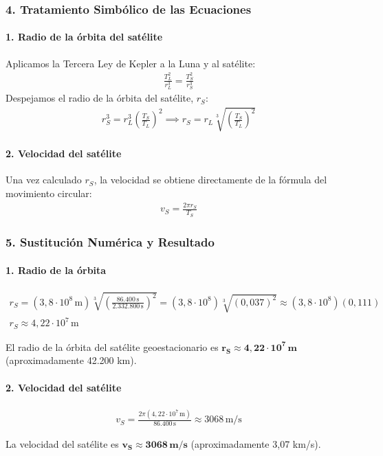 \subsubsection*{4. Tratamiento Simbólico de las Ecuaciones}
\paragraph*{1. Radio de la órbita del satélite}
Aplicamos la Tercera Ley de Kepler a la Luna y al satélite:
\begin{gather}
    \frac{T_L^2}{r_L^3} = \frac{T_S^2}{r_S^3}
\end{gather}
Despejamos el radio de la órbita del satélite, $r_S$:
\begin{gather}
    r_S^3 = r_L^3 \left(\frac{T_S}{T_L}\right)^2 \implies r_S = r_L \sqrt[3]{\left(\frac{T_S}{T_L}\right)^2}
\end{gather}

\paragraph*{2. Velocidad del satélite}
Una vez calculado $r_S$, la velocidad se obtiene directamente de la fórmula del movimiento circular:
\begin{gather}
    v_S = \frac{2\pi r_S}{T_S}
\end{gather}

\subsubsection*{5. Sustitución Numérica y Resultado}
\paragraph*{1. Radio de la órbita}
\begin{gather}
    r_S = (3,8\cdot10^8\,\text{m}) \sqrt[3]{\left(\frac{86.400\,\text{s}}{2.332.800\,\text{s}}\right)^2} = (3,8\cdot10^8) \sqrt[3]{(0,037)^2} \approx (3,8\cdot10^8)(0,111) \\
    r_S \approx 4,22\cdot10^7\,\text{m}
\end{gather}
\begin{cajaresultado}
    El radio de la órbita del satélite geoestacionario es $\boldsymbol{r_S \approx 4,22 \cdot 10^7\,\textbf{m}}$ (aproximadamente 42.200 km).
\end{cajaresultado}

\paragraph*{2. Velocidad del satélite}
\begin{gather}
    v_S = \frac{2\pi (4,22\cdot10^7\,\text{m})}{86.400\,\text{s}} \approx 3068\,\text{m/s}
\end{gather}
\begin{cajaresultado}
    La velocidad del satélite es $\boldsymbol{v_S \approx 3068\,\textbf{m/s}}$ (aproximadamente 3,07 km/s).
\end{cajaresultado}

